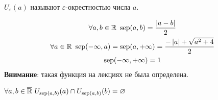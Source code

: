 $U_\varepsilon(a)$ называют $\varepsilon$-окрестностью числа $a$.

\begin{equation}
    \begin{gathered}
        \forall a, b \in \mathbb{R}\ \operatorname{sep}(a, b) = \frac{\left\lvert a - b \right\rvert}{2} \\
        \forall a \in \mathbb{R}\ \operatorname{sep}(-\infty, a) = \operatorname{sep}(a, +\infty) = \frac{-\left\lvert a \right\rvert + \sqrt{a^2+4}}{2} \\
        \operatorname{sep}(-\infty, +\infty) = 1
    \end{gathered}
\end{equation}
\textbf{Внимание}: такая функция на лекциях не была определена.

\begin{theorem}
    $ \forall a, b \in \overline{\mathbb{R}}\ U_{\operatorname{sep}(a, b)}(a) \cap U_{\operatorname{sep}(a, b)}(b) = \varnothing$
\end{theorem}